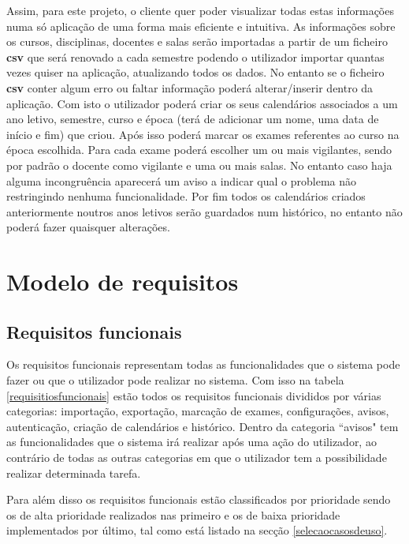\documentclass[11pt, twoside]{report}
\begin{document}
	Assim, para este projeto, o cliente quer poder visualizar todas estas informações numa só aplicação de uma forma mais eficiente e intuitiva.
	As informações sobre os cursos, disciplinas, docentes e salas serão importadas a partir de um ficheiro \textbf{csv} que será renovado a cada semestre podendo o utilizador importar quantas vezes quiser na aplicação, atualizando todos os dados.
	No entanto se o ficheiro \textbf{csv} conter algum erro ou faltar informação poderá alterar/inserir dentro da aplicação.
	Com isto o utilizador poderá criar os seus calendários associados a um ano letivo, semestre, curso e época (terá de adicionar um nome, uma data de início e fim) que criou.
	Após isso poderá marcar os exames referentes ao curso na época escolhida.
	Para cada exame poderá escolher um ou mais vigilantes, sendo por padrão o docente como vigilante e uma ou mais salas.
	No entanto caso haja alguma incongruência aparecerá um aviso a indicar qual o problema não restringindo nenhuma funcionalidade.
	Por fim todos os calendários criados anteriormente noutros anos letivos serão guardados num histórico, no entanto não poderá fazer quaisquer alterações.
	
	\chapter{Modelo de requisitos}
	\label{requisitos}
	\section{Requisitos funcionais}
	
	
	Os requisitos funcionais representam todas as funcionalidades que o sistema pode fazer ou que o utilizador pode realizar no sistema. Com isso na tabela \ref{requisitiosfuncionais} estão todos os requisitos funcionais divididos por várias categorias: importação, exportação, marcação de exames, configurações, avisos, autenticação, criação de calendários e histórico. Dentro da categoria ``avisos" tem as funcionalidades que o sistema irá realizar após uma ação do utilizador, ao contrário de todas as outras categorias em que o utilizador tem a possibilidade realizar determinada tarefa.
	
	Para além disso os requisitos funcionais estão classificados por prioridade sendo os de alta prioridade realizados nas primeiro e os de baixa prioridade implementados por último, tal como está listado na secção \ref{selecaocasosdeuso}.  
	
	
	
\end{document}
